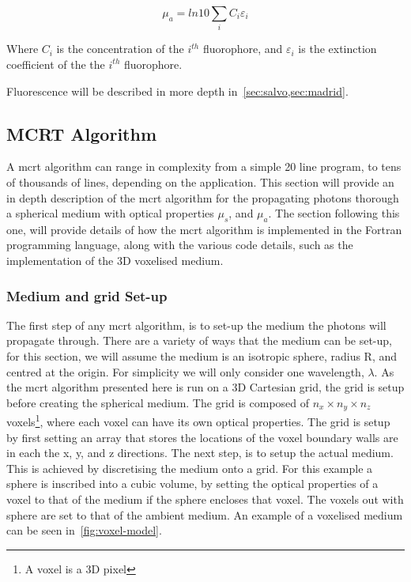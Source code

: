 \begin{equation}
\mu_a=ln10 \sum_i C_i \varepsilon_i
\label{eqn:exct}	
\end{equation}

Where $C_i$ is the concentration of the $i^{th}$ fluorophore, and $\varepsilon_i$ is the extinction coefficient of the the $i^{th}$ fluorophore.

Fluorescence will be described in more depth in~\cref{sec:salvo,sec:madrid}.

\subsection{MCRT Algorithm}

A \gls{mcrt} algorithm can range in complexity from a simple 20 line program, to tens of thousands of lines, depending on the application. This section will provide an in depth description of the \gls{mcrt} algorithm for the propagating photons thorough a spherical medium with optical properties $\mu_s$, and $\mu_a$. The section following this one, will provide details of how the \gls{mcrt} algorithm is implemented in the Fortran programming language, along with the various code details, such as the implementation of the 3D voxelised medium.


\subsubsection*{Medium and grid Set-up}\label{sec:algomedium}
The first step of any \gls{mcrt} algorithm, is to set-up the medium the photons will propagate through. There are a variety of ways that the medium can be set-up, for this section, we will assume the medium is an isotropic sphere, radius R, and centred at the origin. For simplicity we will only consider one wavelength, $\lambda$. As the \gls{mcrt} algorithm presented here is run on a 3D Cartesian grid, the grid is setup before creating the spherical medium. The grid is composed of $n_x \times n_y \times n_z$ voxels\footnote{A voxel is a 3D pixel}, where each voxel can have its own optical properties. The grid is setup by first setting an array that stores the locations of the voxel boundary walls are in each the x, y, and z directions. The next step, is to setup the actual medium. This is achieved by discretising the medium onto a grid. For this example a sphere is inscribed into a cubic volume, by setting the optical properties of a voxel to that of the medium if the sphere encloses that voxel. The voxels out with sphere are set to that of the ambient medium. An example of a voxelised medium can be seen in~\cref{fig:voxel-model}. 

